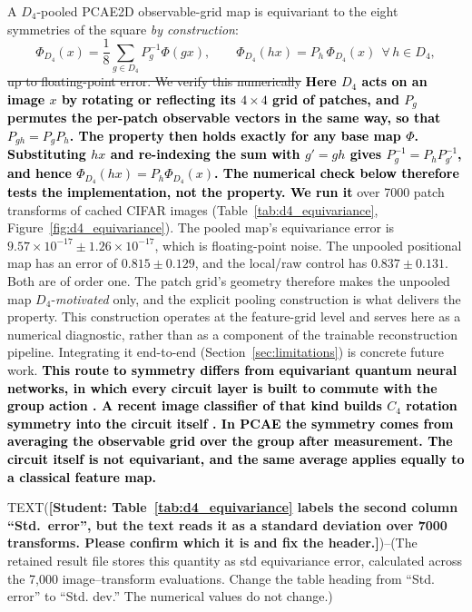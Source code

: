 \documentclass[pdflatex,sn-basic]{sn-jnl}
\newcommand{\del}[1]{\sout{#1}}
\newcommand{\add}[1]{\textbf{\textcolor{black}{#1}}}
\begin{document}
A $D_4$-pooled PCAE2D observable-grid map is equivariant to the eight symmetries
of the square \emph{by construction}:
\begin{equation}
  \Phi_{D_4}(x)=\frac{1}{8}\sum_{g\in D_4}P_g^{-1}\Phi(gx),
  \qquad
  \Phi_{D_4}(hx)=P_h\,\Phi_{D_4}(x)\ \ \forall\, h\in D_4,
\end{equation}
\del{up to floating-point error. We verify this numerically} \add{Here $D_4$
acts on an image $x$ by rotating or reflecting its $4\times4$ grid of patches,
and $P_g$ permutes the per-patch observable vectors in the same way, so that
$P_{gh}=P_gP_h$. The property then holds exactly for any base map $\Phi$.
Substituting $hx$ and re-indexing the sum with $g'=gh$ gives
$P_g^{-1}=P_hP_{g'}^{-1}$, and hence $\Phi_{D_4}(hx)=P_h\Phi_{D_4}(x)$. The
numerical check below therefore tests the implementation, not the property. We
run it} over 7000 patch
transforms of cached CIFAR images (Table~\ref{tab:d4_equivariance},
Figure~\ref{fig:d4_equivariance}). The pooled map's equivariance error is
$9.57\times10^{-17}\pm1.26\times10^{-17}$, which is floating-point noise. The
unpooled positional map has an error of $0.815\pm0.129$, and the local/raw
control has $0.837\pm0.131$. Both are of order one. The patch grid's geometry
therefore makes the unpooled map $D_4$-\emph{motivated} only, and the explicit
pooling construction is what delivers the property. This construction operates
at the feature-grid level and serves here as a numerical diagnostic, rather
than as a component of the trainable reconstruction pipeline. Integrating it
end-to-end (Section~\ref{sec:limitations}) is concrete future work.
\add{This route to symmetry differs from equivariant quantum neural networks,
in which every circuit layer is built to commute with the group action
\citep{Nguyen2024EQNN}. A recent image classifier of that kind builds $C_4$
rotation symmetry into the circuit itself \citep{SanSebastianSein2025}. In PCAE
the symmetry comes from averaging the observable grid over the group after
measurement. The circuit itself is not equivariant, and the same average applies
equally to a classical feature map.}

TEXT({\color{red}\textbf{[Student: Table~\ref{tab:d4_equivariance} labels the second
column ``Std.\ error'', but the text reads it as a standard deviation over 7000
transforms. Please confirm which it is and fix the header.]}})--(The retained result file stores this quantity as
std equivariance error, calculated across the 7,000 image–transform evaluations.
Change the table heading from “Std. error” to “Std. dev.” The numerical values do
not change.)
\end{document}
